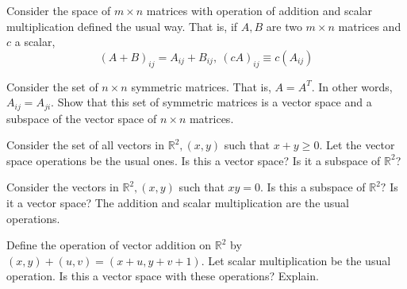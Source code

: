 \documentclass{ximera}
\begin{document}
\begin{problem}\label{prb:10.9} Consider the space of $m\times n$ matrices with operation of addition
and scalar multiplication defined the usual way. That is, if $A,B$ are two $
m\times n$ matrices and $c$ a scalar,
\begin{equation*}
\left( A+B\right) _{ij}=A_{ij}+B_{ij},\ \left( cA\right) _{ij}\equiv c\left(
A_{ij}\right)
\end{equation*}
\end{problem}

\begin{problem}\label{prb:10.10} Consider the set of $n\times n$ symmetric matrices. That is, $A=A^{T}.$
In other words, $A_{ij}=A_{ji}$. Show that this set of symmetric matrices is
a vector space and a subspace of the vector space of $n\times n$ matrices.
\end{problem}

\begin{problem}\label{prb:10.11} Consider the set of all vectors in $\mathbb{R}^{2},\left( x,y\right) $
such that $x+y\geq 0.$ Let the vector space operations be the usual ones. Is
this a vector space? Is it a subspace of $\mathbb{R}^{2}$?
\end{problem}

\begin{problem}\label{prb:10.12} Consider the vectors in $\mathbb{R}^{2},\left( x,y\right) $ such that $xy=0$. Is this a subspace of $\mathbb{R}^{2}?$ Is it a vector space? The
addition and scalar multiplication are the usual operations.
\end{problem}

\begin{problem}\label{prb:10.13} Define the operation of vector addition on $\mathbb{R}^{2}$ by $\left(
x,y\right) +\left( u,v\right) =\left( x+u,y+v+1\right) .$ Let scalar
multiplication be the usual operation. Is this a vector space with these
operations? Explain.
\end{problem}
\end{document}
